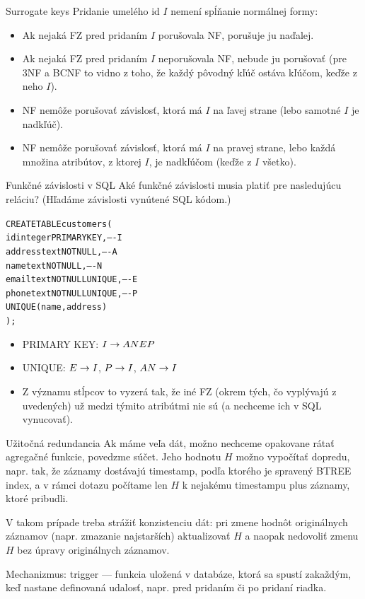 \documentclass[12pt]{beamer}
\begin{document}
\begin{frame}[fragile]{Surrogate keys}
Pridanie umelého id $I$ nemení spĺňanie normálnej formy:
\begin{itemize}
\item Ak nejaká FZ pred pridaním $I$ porušovala NF, porušuje ju naďalej.
\item Ak nejaká FZ pred pridaním $I$ neporušovala NF, nebude ju porušovať
    (pre 3NF a BCNF to vidno z toho, že každý pôvodný kľúč ostáva kľúčom, keďže z neho  $I$).
\item NF nemôže porušovať závislosť, ktorá má $I$ na ľavej strane (lebo samotné $I$ je nadkľúč).
\item NF nemôže porušovať závislosť, ktorá má $I$ na pravej strane,
lebo každá množina atribútov, z ktorej  $I$, je nadkľúčom (keďže z $I$  všetko).
\end{itemize}
\end{frame}

\begin{frame}[fragile]{Funkčné závislosti v SQL}
Aké funkčné závislosti musia platiť pre nasledujúcu reláciu? (Hľadáme závislosti vynútené SQL kódom.)
\begin{alltt}
    CREATE TABLE customers (
        id        integer PRIMARY KEY,     ---- I
        address   text NOT NULL,           ---- A
        name      text NOT NULL,           ---- N
        email     text NOT NULL UNIQUE,    ---- E
        phone     text NOT NULL UNIQUE,    ---- P
        UNIQUE(name, address)
    );
\end{alltt}
\pause
\begin{itemize}
\item PRIMARY KEY: $I\rightarrow ANEP$
\item UNIQUE: $E\rightarrow I$, $P\rightarrow I$, $AN\rightarrow I$
\item Z významu stĺpcov to vyzerá tak, že iné FZ (okrem tých, čo vyplývajú z uvedených) už medzi týmito atribútmi nie sú (a nechceme ich v SQL vynucovať).
\end{itemize}
\end{frame}


\begin{frame}{Užitočná redundancia}
Ak máme veľa dát, možno nechceme opakovane rátať agregačné funkcie, povedzme súčet.
Jeho hodnotu $H$ možno vypočítať dopredu, napr. tak, že záznamy dostávajú timestamp,
podľa ktorého je spravený BTREE index, a v rámci dotazu počítame
len $H$ k nejakému timestampu plus záznamy, ktoré pribudli.

\bigskip
V takom prípade treba strážiť konzistenciu dát: pri zmene hodnôt originálnych záznamov
(napr. zmazanie najstarších) aktualizovať $H$ a naopak nedovoliť zmenu $H$ bez úpravy originálnych záznamov.

\bigskip
Mechanizmus: \alert{trigger} --- funkcia uložená v databáze, ktorá sa spustí zakaždým,
keď nastane definovaná udalosť, napr. pred pridaním či po pridaní riadka.
\end{frame}
\end{document}
